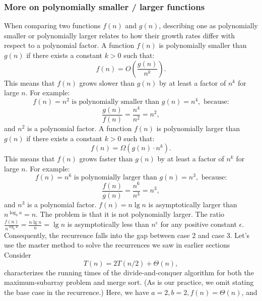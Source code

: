 \documentclass{report}
\begin{document}
        \subsubsection{More on polynomially smaller / larger functions}
        \bigbreak \noindent 
        When comparing two functions $f(n)$ and $g(n)$, describing one as polynomially smaller or polynomially larger relates to how their growth rates differ with respect to a polynomial factor.
        \bigbreak \noindent 
        A function \( f(n) \) is polynomially smaller than \( g(n) \) if there exists a constant \( k > 0 \) such that:
        \[
            f(n) = O\left(\frac{g(n)}{n^k}\right).
        \]
        This means that \( f(n) \) grows slower than \( g(n) \) by at least a factor of \( n^k \) for large \( n \).
        \bigbreak \noindent 
        For example:
        \[
            f(n) = n^2 \text{ is polynomially smaller than } g(n) = n^4, \text{ because:}
        \]
        \[
            \frac{g(n)}{f(n)} = \frac{n^4}{n^2} = n^2,
        \]
        and \( n^2 \) is a polynomial factor.
        \bigbreak \noindent 
        A function \( f(n) \) is polynomially larger than \( g(n) \) if there exists a constant \( k > 0 \) such that:
        \[
            f(n) = \Omega\left(g(n) \cdot n^k\right).
        \]
        This means that \( f(n) \) grows faster than \( g(n) \) by at least a factor of \( n^k \) for large \( n \).
        \bigbreak \noindent 
        For example:
        \[
            f(n) = n^6 \text{ is polynomially larger than } g(n) = n^3, \text{ because:}
        \]
        \[
            \frac{f(n)}{g(n)} = \frac{n^6}{n^3} = n^3,
        \]
        and \( n^3 \) is a polynomial factor.
        \bigbreak \noindent 
        \( f(n) = n \lg n \) is asymptotically larger than \( n^{\log_b a} = n \). The problem is that it
        is not polynomially larger. The ratio \( \frac{f(n)}{n^{\log_b a}} = \frac{n \lg n}{n} = \lg n \) is asymptotically
        less than \( n^\epsilon \) for any positive constant \( \epsilon \). Consequently, the recurrence falls
        into the gap between case 2 and case 3. 
        \bigbreak \noindent 
        Let’s use the master method to solve the recurrences we saw in earlier sections
        \bigbreak \noindent 
        Consider
        \[
            T(n) = 2T(n/2) + \Theta(n),
        \]
        characterizes the running times of the divide-and-conquer algorithm for both the
        maximum-subarray problem and merge sort. (As is our practice, we omit stating
        the base case in the recurrence.) Here, we have \( a = 2, b = 2, f(n) = \Theta(n) \), and
\end{document}
